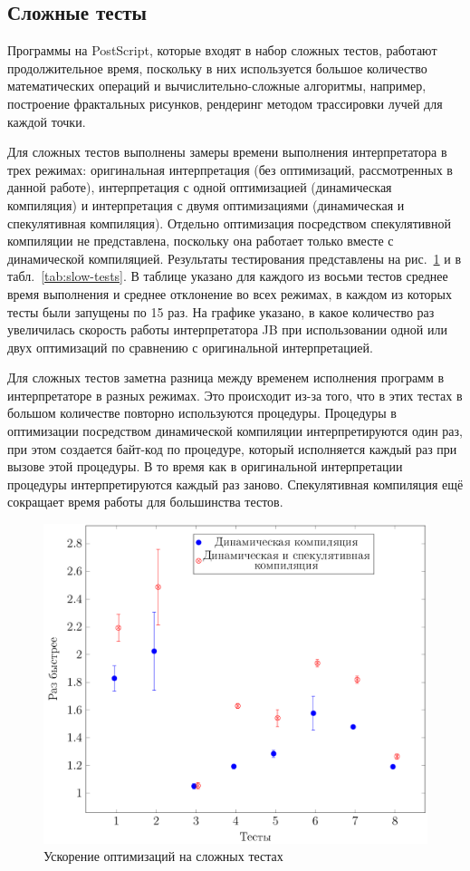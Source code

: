 	\subsection*{Сложные тесты}
	Программы на PostScript, которые входят в набор сложных тестов, работают продолжительное время, поскольку в них используется большое количество математических операций и вычислительно-сложные алгоритмы, например, построение фрактальных рисунков, рендеринг методом трассировки лучей для каждой точки.
	
	Для сложных тестов выполнены замеры времени выполнения интерпретатора в трех режимах: оригинальная интерпретация (без оптимизаций, рассмотренных в данной работе), интерпретация с одной оптимизацией (динамическая компиляция) и интерпретация с двумя оптимизациями (динамическая и спекулятивная компиляция). Отдельно оптимизация посредством спекулятивной компиляции не представлена, поскольку она работает только вместе с динамической компиляцией. Результаты тестирования представлены на  рис.~\ref{graphic: slow} и в табл.~\ref{tab:slow-tests}.
	В таблице указано для каждого из восьми тестов среднее время выполнения и среднее отклонение во всех режимах, в каждом из которых тесты были запущены по 15 раз. На графике указано, в какое количество раз увеличилась скорость работы интерпретатора JB при использовании одной или двух оптимизаций по сравнению с оригинальной интерпретацией. 
	
	Для сложных тестов заметна разница между временем исполнения программ в интерпретаторе в разных режимах. Это происходит из-за того, что в этих тестах в большом количестве повторно используются процедуры. Процедуры в оптимизации посредством динамической компиляции интерпретируются один раз, при этом создается байт-код по процедуре, который исполняется каждый раз при вызове этой процедуры. В то время как в оригинальной интерпретации процедуры интерпретируются каждый раз заново. Спекулятивная компиляция ещё сокращает время работы для большинства тестов.
		\begin{figure} [h]
			\includegraphics[width=0.87\linewidth]{Pozdin/TimesGraphic.png}
			\caption{Ускорение оптимизаций на сложных тестах}\label{graphic: slow}
		\end{figure}	
		
